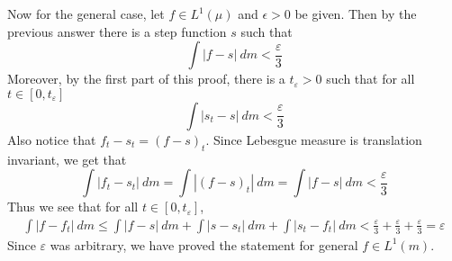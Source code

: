 \documentclass[12pt]{exam}
\theoremstyle{plain} %
\theoremstyle{definition} %
\theoremstyle{remark} %
\begin{document}
\begin{questions}
\begin{solution}
    Now for the general case, let $f \in L^1(\mu)$ and $\epsilon > 0$
    be given. Then by the previous answer there is a step function
    $s$ such that  \[
      \int |f - s| \ d m <  \frac{\varepsilon}{3}
    \]
    Moreover, by the first part of this proof, there is a
    $t_\varepsilon > 0$ such that for all $t \in [0, t_\varepsilon]$ \[
      \int |s_t - s| \ d m < \frac{\varepsilon}{3}
    \]
    Also notice that $f_t - s_t = (f-s)_t$.
    Since Lebesgue measure is translation invariant, we get that \[
      \int |f_t - s_t| \ d m  = \int |(f-s)_t| \ d m = \int |f - s|
      \ d m < \frac{\varepsilon}{3}
    \]
    Thus we see that for all $t \in [0, t_\varepsilon]$,
    \begin{align*}
      \int |f - f_t| \ d m \le \int |f-s| \ d m + \int |s - s_t| \ d
      m + \int |s_t - f_t| \ d m < \frac{\varepsilon}{3} +
      \frac{\varepsilon}{3} + \frac{\varepsilon}{3} = \varepsilon
    \end{align*}
    Since $\varepsilon$ was arbitrary, we have proved the statement
    for general $f \in L^1(m)$.
  \end{solution}

\end{questions}
\printbibliography[heading=bibintoc]
\end{document}
